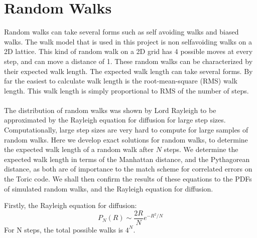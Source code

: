 \section{Random Walks}
	Random walks can take several forms such as self avoiding walks and biased walks. The walk model that is used in this project is non selfavoiding walks on a 2D lattice. This kind of random walk on a 2D grid has 4 possible moves at every step, and can move a distance of 1. 
 	These random walks can be characterized by their expected walk length. The expected walk length can take several forms.
 	By far the easiest to calculate walk length is the root-mean-square (RMS) walk length. This walk length is simply proportional to RMS of the number of steps. 	
	\\\\
 	The distribution of random walks was shown by Lord Rayleigh \cite{bibid} to be approximated by the Rayleigh equation for diffusion for large step sizes. Computationally, large step sizes are very hard to compute for large samples of random walks. Here we develop exact solutions for random walks, to determine the expected walk length of a random walk after $N$ steps. We determine the expected walk length in terms of the Manhattan distance, and the Pythagorean distance, as both are of importance to the match scheme for correlated errors on the Toric code. We shall then confirm the results of these equations to the PDFs of simulated random walks, and the Rayleigh equation for diffusion. 
 	
 	Firstly, the Rayleigh equation for diffusion:
 	\begin{equation}
 	P_N(R) \sim \frac{2R}{N}e ^{-R^2/N}
 	\label{eq:rayleigh}
 	\end{equation}
	For N steps, the total possible walks is $4^N$.
	
